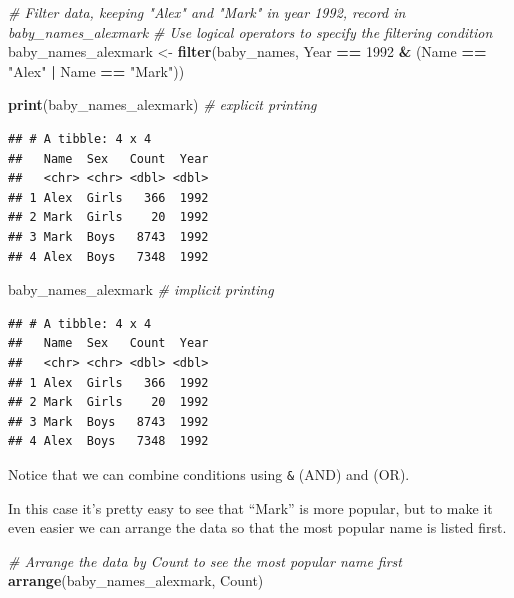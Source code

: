 \documentclass[
]{book}
\newenvironment{Shaded}{\begin{snugshade}}{\end{snugshade}}
\newcommand{\CommentTok}[1]{\textcolor[rgb]{0.56,0.35,0.01}{\textit{#1}}}
\newcommand{\DecValTok}[1]{\textcolor[rgb]{0.00,0.00,0.81}{#1}}
\newcommand{\KeywordTok}[1]{\textcolor[rgb]{0.13,0.29,0.53}{\textbf{#1}}}
\newcommand{\NormalTok}[1]{#1}
\newcommand{\OperatorTok}[1]{\textcolor[rgb]{0.81,0.36,0.00}{\textbf{#1}}}
\newcommand{\StringTok}[1]{\textcolor[rgb]{0.31,0.60,0.02}{#1}}
\begin{document}
\begin{Shaded}
\begin{Highlighting}[]
\CommentTok{\# Filter data, keeping "Alex" and "Mark" in year 1992, record in baby\_names\_alexmark}
\CommentTok{\# Use logical operators to specify the filtering condition}
\NormalTok{baby\_names\_alexmark \textless{}{-}}\StringTok{ }\KeywordTok{filter}\NormalTok{(baby\_names, }
\NormalTok{             Year }\OperatorTok{==}\StringTok{ }\DecValTok{1992} \OperatorTok{\&}\StringTok{ }\NormalTok{(Name }\OperatorTok{==}\StringTok{ "Alex"} \OperatorTok{|}\StringTok{ }\NormalTok{Name }\OperatorTok{==}\StringTok{ "Mark"}\NormalTok{))}

\KeywordTok{print}\NormalTok{(baby\_names\_alexmark) }\CommentTok{\# explicit printing}
\end{Highlighting}
\end{Shaded}

\begin{verbatim}
## # A tibble: 4 x 4
##   Name  Sex   Count  Year
##   <chr> <chr> <dbl> <dbl>
## 1 Alex  Girls   366  1992
## 2 Mark  Girls    20  1992
## 3 Mark  Boys   8743  1992
## 4 Alex  Boys   7348  1992
\end{verbatim}

\begin{Shaded}
\begin{Highlighting}[]
\NormalTok{baby\_names\_alexmark }\CommentTok{\# implicit printing}
\end{Highlighting}
\end{Shaded}

\begin{verbatim}
## # A tibble: 4 x 4
##   Name  Sex   Count  Year
##   <chr> <chr> <dbl> <dbl>
## 1 Alex  Girls   366  1992
## 2 Mark  Girls    20  1992
## 3 Mark  Boys   8743  1992
## 4 Alex  Boys   7348  1992
\end{verbatim}

Notice that we can combine conditions using \texttt{\&} (AND) and \texttt{\textbar{}} (OR).

In this case it's pretty easy to see that ``Mark'' is more popular, but to make it even easier we can arrange the data so that the most popular name is listed first.

\begin{Shaded}
\begin{Highlighting}[]
\CommentTok{\# Arrange the data by Count to see the most popular name first}
\KeywordTok{arrange}\NormalTok{(baby\_names\_alexmark, Count)}
\end{Highlighting}
\end{Shaded}
\end{document}
